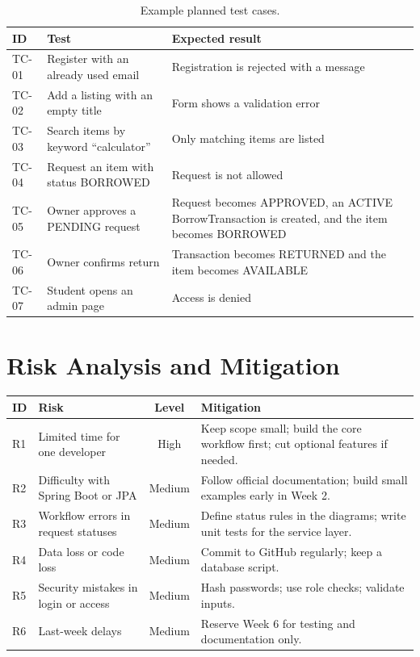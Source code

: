 \documentclass[11pt,a4paper]{article}
\begin{document}
\begin{table}[H]
\centering
\caption{Example planned test cases.}\label{tab:tests}
\small
\begin{tabularx}{\textwidth}{@{}l X X@{}}
\toprule
\textbf{ID} & \textbf{Test} & \textbf{Expected result}\\
\midrule
TC-01 & Register with an already used email & Registration is rejected with a message\\
TC-02 & Add a listing with an empty title & Form shows a validation error\\
TC-03 & Search items by keyword ``calculator'' & Only matching items are listed\\
TC-04 & Request an item with status BORROWED & Request is not allowed\\
TC-05 & Owner approves a PENDING request & Request becomes APPROVED, an ACTIVE BorrowTransaction is created, and the item becomes BORROWED\\
TC-06 & Owner confirms return & Transaction becomes RETURNED and the item becomes AVAILABLE\\
TC-07 & Student opens an admin page & Access is denied\\
\bottomrule
\end{tabularx}
\end{table}

\section{Risk Analysis and Mitigation}
\begin{tabularx}{\textwidth}{@{}l X c X@{}}
\toprule
\textbf{ID} & \textbf{Risk} & \textbf{Level} & \textbf{Mitigation}\\
\midrule
R1 & Limited time for one developer & High & Keep scope small; build the core workflow first; cut optional features if needed.\\
R2 & Difficulty with Spring Boot or JPA & Medium & Follow official documentation; build small examples early in Week 2.\\
R3 & Workflow errors in request statuses & Medium & Define status rules in the diagrams; write unit tests for the service layer.\\
R4 & Data loss or code loss & Medium & Commit to GitHub regularly; keep a database script.\\
R5 & Security mistakes in login or access & Medium & Hash passwords; use role checks; validate inputs.\\
R6 & Last-week delays & Medium & Reserve Week 6 for testing and documentation only.\\
\bottomrule
\end{tabularx}
\end{document}
